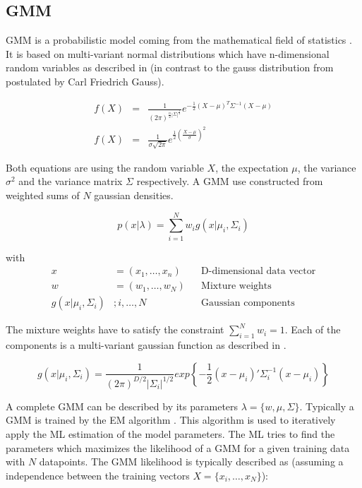 \subsection{\acf*{GMM}}
\label{sec:gmm}

\acl{GMM} is a probabilistic model coming from the mathematical field of statistics \cite{mclachlan1988mixture}. It is based on multi-variant normal distributions which have n-dimensional random variables as described in  (in contrast to the gauss distribution from  postulated by Carl Friedrich Gauss).

\begin{eqnarray}
\label{eqn:mulgauss}
f(X) &=& \frac{
1
}{
(2\pi)^{\frac{n}{2} |\Sigma|^{\frac{1}{2}}}
} e ^ { - \frac{1}{2} (X - \mu)^T \Sigma^{-1} (X - \mu) }
\\
\label{eqn:singlegauss}
f(X) &=& \frac{1}{\sigma\sqrt{2\pi}}e^{\frac{1}{2} (\frac{X - \mu}{\sigma})^2}
\end{eqnarray}

Both equations are using the random variable $X$, the expectation $\mu$, the variance $\sigma^2$ and the variance matrix $\Sigma$ respectively. A \acl{GMM} use constructed from weighted sums of $N$ gaussian densities.

\begin{equation}
p(x|\lambda) = \sum_{i=1}^{N} w_i g(x| \mu_i, \Sigma_i)
\end{equation}

with
\begin{align*}
x & = (x_{1},\dotsc,x_{n}) && \text{D-dimensional data vector}\\
w & = (w_1,\dots,w_{N}) && \text{Mixture weights}\\
g(x| \mu_i, \Sigma_i) & ; i,\dots,N && \text{Gaussian components}
\end{align*}

The mixture weights have to satisfy the constraint $\sum_{i=1}^N w_i = 1$. Each of the components is a multi-variant gaussian function as described in .

\begin{equation}
\label{eqn:gauss_func}
g(x|\mu_i, \Sigma_i) = \frac{1}{(2\pi)^{D/2} | \Sigma_i |^{1/2}} exp \left\{ - \frac{1}{2} (x - \mu_i)' \Sigma_i^{-1} (x - \mu_i) \right\}
\end{equation}

A complete \ac{GMM} can be described by its parameters $\lambda = \{w, \mu, \Sigma\}$. Typically a \ac{GMM} is trained by the \acf{EM} algorithm \cite{dempster1977maximum}. This algorithm is used to iteratively apply the \ac{ML} estimation of the model parameters. The \ac{ML} tries to find the parameters which maximizes the likelihood of a \ac{GMM} for a given training data with $N$ datapoints. The \ac{GMM} likelihood is typically described as (assuming a independence between the training vectors $X = \{x_i,\dots,x_N\}$):

